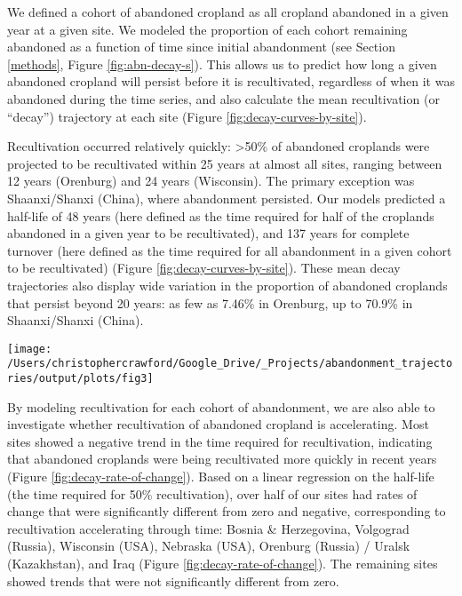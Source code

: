 \documentclass[9pt,twocolumn,twoside,lineno]{pnas-new}
\begin{document}
We defined a cohort of abandoned cropland as all cropland abandoned in a given year at a given site.
We modeled the proportion of each cohort remaining abandoned as a function of time since initial abandonment (see Section \ref{methods}, Figure \ref{fig:abn-decay-s}).
This allows us to predict how long a given abandoned cropland will persist before it is recultivated, regardless of when it was abandoned during the time series, and also calculate the mean recultivation (or ``decay'') trajectory at each site (Figure \ref{fig:decay-curves-by-site}).

Recultivation occurred relatively quickly: \textgreater50\% of abandoned croplands were projected to be recultivated within 25 years at almost all sites, ranging between 12 years (Orenburg) and 24 years (Wisconsin).
The primary exception was Shaanxi/Shanxi (China), where abandonment persisted.
Our models predicted a half-life of 48 years (here defined as the time required for half of the croplands abandoned in a given year to be recultivated), and 137 years for complete turnover (here defined as the time required for all abandonment in a given cohort to be recultivated) (Figure \ref{fig:decay-curves-by-site}).
These mean decay trajectories also display wide variation in the proportion of abandoned croplands that persist beyond 20 years: as few as 7.46\% in Orenburg, up to 70.9\% in Shaanxi/Shanxi (China).



\begin{figure*}
\texttt{[image: /Users/christophercrawford/Google\_Drive/\_Projects/abandonment\_trajectories/output/plots/fig3]} \caption{Mean decay trajectories for each site, based on a linear model predicting the proportion of abandoned land remaining abandoned as a function of time (including a linear and a logarithmic term of time). The function describing each site's mean trajectory is calculated by taking the mean of each time coefficient across all cohorts of abandonment at each site.}\label{fig:decay-curves-by-site}
\end{figure*}

By modeling recultivation for each cohort of abandonment, we are also able to investigate whether recultivation of abandoned cropland is accelerating.
Most sites showed a negative trend in the time required for recultivation, indicating that abandoned croplands were being recultivated more quickly in recent years (Figure \ref{fig:decay-rate-of-change}).
Based on a linear regression on the half-life (the time required for 50\% recultivation), over half of our sites had rates of change that were significantly different from zero and negative, corresponding to recultivation accelerating through time: Bosnia \& Herzegovina, Volgograd (Russia), Wisconsin (USA), Nebraska (USA), Orenburg (Russia) / Uralsk (Kazakhstan), and Iraq (Figure \ref{fig:decay-rate-of-change}).
The remaining sites showed trends that were not significantly different from zero.
\end{document}
